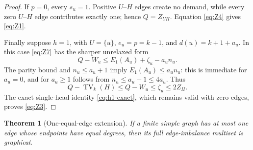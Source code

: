 \documentclass[a4paper,11pt]{amsart}
\numberwithin{equation}{section}
\newtheorem{theorem}{Theorem}[section]
\theoremstyle{definition}
\theoremstyle{remark}
\newcommand{\TV}{\operatorname{TV}}
\begin{document}
\begin{proof}
If $p=0$, every $s_u=1$.  Positive $U$--$H$ edges create no demand, while every zero $U$--$H$ edge contributes exactly one; hence $Q=Z_{UH}$.  Equation \eqref{eq:Z4} gives \eqref{eq:Z1}.

Finally suppose $h=1$, with $U=\{u\}$, $e_u=p=k-1$, and $d(u)=k+1+a_u$.  In this case \eqref{eq:Z7} has the sharper unrelaxed form
\begin{equation}
Q-W_u\le E_1(A_u)+\zeta_u-a_un_u.
\label{eq:h1-zero-local}
\end{equation}
The parity bound and $n_u\le a_u+1$ imply $E_1(A_u)\le a_un_u$: this is immediate for $a_u=0$, and for $a_u\ge1$ follows from $n_u\le a_u+1\le4a_u$.  Thus
\[
Q-\TV_k(H)\le Q-W_u\le\zeta_u\le2Z_H.
\]
The exact single-head identity \eqref{eq:h1-exact}, which remains valid with zero edges, proves \eqref{eq:Z3}.
\end{proof}

\begin{theorem}[One-equal-edge extension]\label{thm:one-zero}
If a finite simple graph has at most one edge whose endpoints have equal degrees, then its full edge-imbalance multiset is graphical.
\end{theorem}
\end{document}
